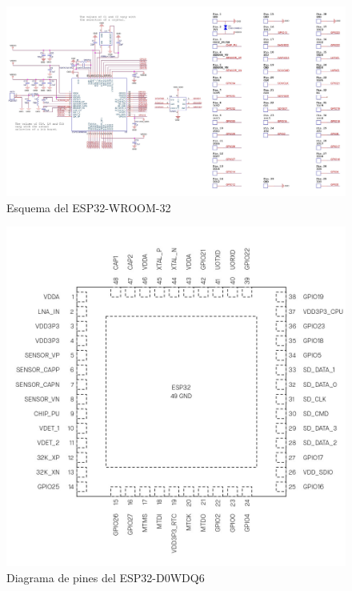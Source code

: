 \documentclass[../main]{subfiles}
\begin{document}
\begin{landscape}
	\begin{figure}[H]
		\centering
		\includegraphics[height=0.85\textheight]{res/esp32-wroom-32_diagram.jpg}
		\caption{Esquema del ESP32-WROOM-32\cite{esp32wroom32doc}}
		\label{esp32wroom32esq}
	\end{figure}
\end{landscape}

\begin{figure}[H]
	\centering
	\includegraphics[width=\textwidth]{res/esp32_datasheet_en_page-0013.jpg}
	\caption{Diagrama de pines del ESP32-D0WDQ6\cite{esp32d0wdq62doc}}
	\label{fig:esp32d0wdq62pines}
\end{figure}
\end{document}
